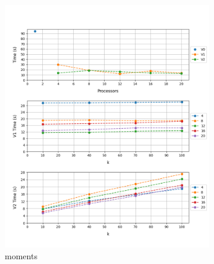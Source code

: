 \documentclass[12pt, a4paper]{article}
\begin{document}
\begin{figure}[h!]
     \hfill
     \begin{subfigure}[b]{0.33\textwidth}
         \centering
         \includegraphics[height=.4\textheight, width=\textwidth, keepaspectratio]{assets/corel/moments.png}
         \caption{moments}
     \end{subfigure}
     \begin{subfigure}[b]{0.33\textwidth}
         \centering

\end{subfigure}
\end{figure}
\end{document}
